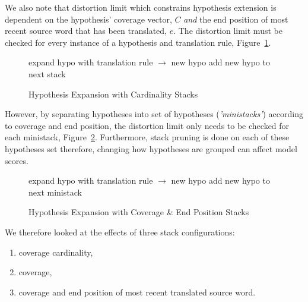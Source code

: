 \documentclass[11pt]{article}
\begin{document}
We also note that distortion limit which constrains hypothesis extension is dependent on the hypothesis' coverage vector, $C$ \emph{and} the end position of most recent source word that has been translated, $e$. The distortion limit must be checked for every instance of a hypothesis and translation rule, Figure~\ref{algo:Hypothesis Expansion with Unsorted Stack}.
\begin{figure} [h]
\begin{algorithmic}
	\STATE expand hypo with translation rule $\rightarrow$ new hypo
	\STATE add new hypo to next stack
      \ENDIF
  \ENDFOR %
\ENDFOR %
\end{algorithmic}
\caption{Hypothesis Expansion with Cardinality Stacks}
\label{algo:Hypothesis Expansion with Unsorted Stack}
\end{figure}
However, by separating hypotheses into set of hypotheses (\emph{'ministacks'}) according to coverage and end position, the distortion limit only needs to be checked for each ministack, Figure~\ref{algo:Hypothesis Expansion with Sorted Stack}. Furthermore, stack pruning is done on each of these hypotheses set therefore, changing how hypotheses are grouped can affect model scores. 
\begin{figure} [h]
\begin{algorithmic}
	\STATE expand hypo with translation rule $\rightarrow$ new hypo
	\STATE add new hypo to next ministack
      \ENDFOR
    \ENDIF
  \ENDFOR %
\ENDFOR %
\end{algorithmic}
\caption{Hypothesis Expansion with Coverage \& End Position Stacks}
\label{algo:Hypothesis Expansion with Sorted Stack}
\end{figure}
We therefore looked at the effects of three stack configurations:
\begin{enumerate}
  \item coverage cardinality,
  \item coverage,
  \item coverage and end position of most recent translated source word.
\end{enumerate}
\end{document}
